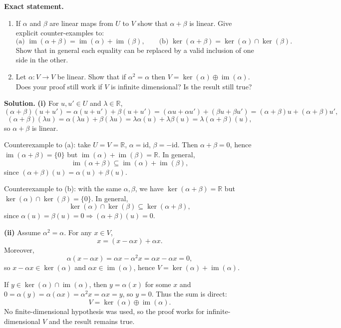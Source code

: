 \documentclass[12pt,a4paper]{article}
\theoremstyle{plain}
\theoremstyle{definition}      %
\begin{document}
\textbf{Exact statement.}
\begin{enumerate}
	\item[(i)] If $\alpha$ and $\beta$ are linear maps from $U$ to $V$ show that $\alpha+\beta$ is linear.
	Give explicit counter-examples to:
	\[
	\text{(a) }\operatorname{im}(\alpha+\beta)=\operatorname{im}(\alpha)+\operatorname{im}(\beta),\qquad
	\text{(b) }\ker(\alpha+\beta)=\ker(\alpha)\cap\ker(\beta).
	\]
	Show that in general each equality can be replaced by a valid inclusion of one side in the other.
	\item[(ii)] Let $\alpha:V\to V$ be linear. Show that if $\alpha^2=\alpha$ then
	$V=\ker(\alpha)\oplus \operatorname{im}(\alpha)$.
	Does your proof still work if $V$ is infinite dimensional? Is the result still true?
\end{enumerate}

\textbf{Solution.}
\textbf{(i)} For $u,u'\in U$ and $\lambda\in\mathbb R$,
\[
(\alpha+\beta)(u+u')=\alpha(u+u')+\beta(u+u')
=(\alpha u+\alpha u')+(\beta u+\beta u')
=(\alpha+\beta)u+(\alpha+\beta)u',
\]
\[
(\alpha+\beta)(\lambda u)=\alpha(\lambda u)+\beta(\lambda u)=\lambda\alpha(u)+\lambda\beta(u)
=\lambda(\alpha+\beta)(u),
\]
so $\alpha+\beta$ is linear.

Counterexample to (a): take $U=V=\mathbb R$, $\alpha=\mathrm{id}$, $\beta=-\mathrm{id}$.
Then $\alpha+\beta=0$, hence $\operatorname{im}(\alpha+\beta)=\{0\}$ but
$\operatorname{im}(\alpha)+\operatorname{im}(\beta)=\mathbb R$.
In general,
\[
\operatorname{im}(\alpha+\beta)\subseteq \operatorname{im}(\alpha)+\operatorname{im}(\beta),
\]
since $(\alpha+\beta)(u)=\alpha(u)+\beta(u)$.

Counterexample to (b): with the same $\alpha,\beta$, we have $\ker(\alpha+\beta)=\mathbb R$ but
$\ker(\alpha)\cap\ker(\beta)=\{0\}$.
In general,
\[
\ker(\alpha)\cap\ker(\beta)\subseteq \ker(\alpha+\beta),
\]
since $\alpha(u)=\beta(u)=0\Rightarrow (\alpha+\beta)(u)=0$.

\medskip
\textbf{(ii)} Assume $\alpha^2=\alpha$.
For any $x\in V$,
\[
x=(x-\alpha x)+\alpha x.
\]
Moreover,
\[
\alpha(x-\alpha x)=\alpha x-\alpha^2 x=\alpha x-\alpha x=0,
\]
so $x-\alpha x\in\ker(\alpha)$ and $\alpha x\in\operatorname{im}(\alpha)$, hence
$V=\ker(\alpha)+\operatorname{im}(\alpha)$.

If $y\in\ker(\alpha)\cap\operatorname{im}(\alpha)$, then $y=\alpha(x)$ for some $x$ and
$0=\alpha(y)=\alpha(\alpha x)=\alpha^2 x=\alpha x=y$, so $y=0$. Thus the sum is direct:
\[
V=\ker(\alpha)\oplus\operatorname{im}(\alpha).
\]
No finite-dimensional hypothesis was used, so the proof works for infinite-dimensional $V$ and the result remains true.
\end{document}
